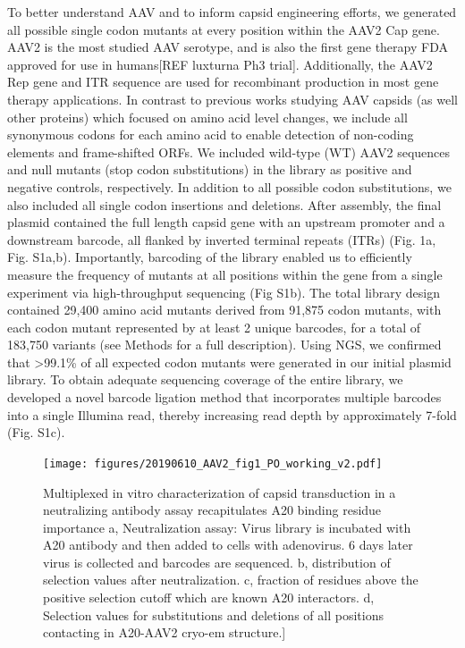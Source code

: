 To better understand AAV and to inform capsid engineering efforts, we generated all possible single codon mutants at every position within the AAV2 Cap gene. AAV2 is the most studied AAV serotype, and is also the first gene therapy FDA approved for use in humans[REF luxturna Ph3 trial]. Additionally, the AAV2 Rep gene and ITR sequence are used for recombinant production in most gene therapy applications. In contrast to previous works studying AAV capsids (as well other proteins) which focused on amino acid level changes, we include all synonymous codons for each amino acid to enable detection of non-coding elements and frame-shifted ORFs. We included wild-type (WT) AAV2 sequences and null mutants (stop codon substitutions) in the library as positive and negative controls, respectively. In addition to all possible codon substitutions, we also included all single codon insertions and deletions. After assembly, the final plasmid contained the full length capsid gene with an upstream promoter and a downstream barcode, all flanked by inverted terminal repeats (ITRs) (Fig. 1a, Fig. S1a,b). Importantly, barcoding of the library enabled us to efficiently measure the frequency of mutants at all positions within the gene from a single experiment via high-throughput sequencing (Fig S1b). The total library design contained 29,400 amino acid mutants derived from 91,875 codon mutants, with each codon mutant represented by at least 2 unique barcodes, for a total of 183,750 variants (see Methods for a full description). Using NGS, we confirmed that >99.1\% of all expected codon mutants were generated in our initial plasmid library. To obtain adequate sequencing coverage of the entire library, we developed a novel barcode ligation method that incorporates multiple barcodes into a single Illumina read, thereby increasing read depth by approximately 7-fold (Fig. S1c).

\begin{figure}
\texttt{[image: figures/20190610\_AAV2\_fig1\_PO\_working\_v2.pdf]}
\caption[Multiplexed in vitro characterization of capsid transduction in a neutralizing antibody assay recapitulates A20 binding residue importance]{Multiplexed in vitro characterization of capsid transduction in a neutralizing antibody assay recapitulates A20 binding residue importance 
a, Neutralization assay: Virus library is incubated with A20 antibody and then added to cells with adenovirus. 6 days later virus is collected and barcodes are sequenced. b, distribution of selection values after neutralization. c, fraction of residues above the positive selection cutoff which are known A20 interactors. d, Selection values for substitutions and deletions of all positions contacting in A20-AAV2 cryo-em structure.]
\label{fig:Figure 1}}
\end{figure}

